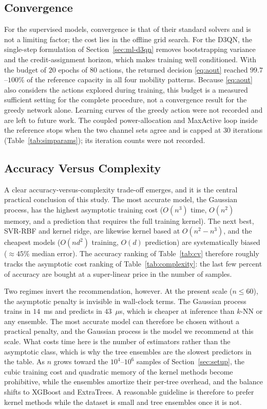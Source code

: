 \documentclass[correspondence]{IEEEtaes}
\begin{document}
\subsection{Convergence}
For the supervised models, convergence is that of their standard solvers and is not a
limiting factor; the cost lies in the offline grid search. For the D3QN, the
single-step formulation of Section~\ref{sec:ml-d3qn} removes bootstrapping variance and
the credit-assignment horizon, which makes training well conditioned. With the budget of
$20$ epochs of $80$ actions, the returned decision \eqref{eq:aout} reached $99.7$--$100\%$
of the reference capacity in all four mobility patterns. Because \eqref{eq:aout} also
considers the actions explored during training, this budget is a measured sufficient
setting for the complete procedure, not a convergence result for the greedy network
alone. Learning curves of the greedy action were not recorded and are left to future
work. The coupled power-allocation and MaxActive loop inside the reference stops when
the two channel sets agree and is capped at $30$ iterations
(Table~\ref{tab:simparams}); its iteration counts were not recorded.

\subsection{Accuracy Versus Complexity}
A clear accuracy-versus-complexity trade-off emerges, and it is the central practical
conclusion of this study. The most accurate model, the Gaussian process, has the highest
asymptotic training cost ($O(n^3)$ time, $O(n^2)$ memory, and a prediction that requires
the full training kernel). The next best, SVR-RBF and kernel ridge, are likewise kernel based at
$O(n^2\!-\!n^3)$, and the cheapest models ($O(nd^2)$ training, $O(d)$ prediction) are
systematically biased ($\approx45\%$ median error). The accuracy ranking of
Table~\ref{tab:cv} therefore roughly tracks the asymptotic cost ranking of
Table~\ref{tab:complexity}: the last few percent of accuracy are bought at a
super-linear price in the number of samples.

Two regimes invert the recommendation, however. At the present scale ($n\le60$), the
asymptotic penalty is invisible in wall-clock terms. The Gaussian process trains in
$14$~ms and predicts in $43$~$\mu$s, which is cheaper at inference than $k$-NN or any
ensemble. The most accurate model can therefore be chosen without a practical penalty, and
the Gaussian process is the model we recommend at this scale. What costs time here is the
number of estimators rather than the asymptotic class, which is why the tree ensembles are
the slowest predictors in the table. As $n$ grows toward the $10^4$--$10^6$ samples of
Section~\ref{sec:setup}, the cubic training cost and quadratic memory of the kernel
methods become prohibitive, while the ensembles amortize their per-tree overhead, and the
balance shifts to XGBoost and ExtraTrees. A reasonable guideline is therefore to prefer
kernel methods while the dataset is small and tree ensembles once it is not.
\end{document}
